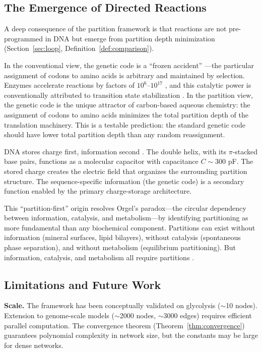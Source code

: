 \documentclass[twocolumn,10pt,a4paper]{article}
\theoremstyle{definition}
\theoremstyle{remark}
\begin{document}
\subsection{The Emergence of Directed Reactions}

A deep consequence of the partition framework is that reactions are not pre-programmed in DNA but emerge from partition depth minimization (Section~\ref{sec:loop}, Definition~\ref{def:comparison}).

In the conventional view, the genetic code is a ``frozen accident'' \citep{Eigen1971}---the particular assignment of codons to amino acids is arbitrary and maintained by selection. Enzymes accelerate reactions by factors of $10^6$--$10^{17}$ \citep{Wolfenden2001}, and this catalytic power is conventionally attributed to transition state stabilization \citep{Eyring1935}. In the partition view, the genetic code is the unique attractor of carbon-based aqueous chemistry: the assignment of codons to amino acids minimizes the total partition depth of the translation machinery. This is a testable prediction: the standard genetic code should have lower total partition depth than any random reassignment.

DNA stores charge first, information second \citep{Sachikonye2024c}. The double helix, with its $\pi$-stacked base pairs, functions as a molecular capacitor with capacitance $C \sim 300$ pF. The stored charge creates the electric field that organizes the surrounding partition structure. The sequence-specific information (the genetic code) is a secondary function enabled by the primary charge-storage architecture.

This ``partition-first'' origin resolves Orgel's paradox---the circular dependency between information, catalysis, and metabolism---by identifying partitioning as more fundamental than any biochemical component. Partitions can exist without information (mineral surfaces, lipid bilayers), without catalysis (spontaneous phase separation), and without metabolism (equilibrium partitioning). But information, catalysis, and metabolism all require partitions \citep{Sachikonye2024c}.

\subsection{Limitations and Future Work}

\textbf{Scale.} The framework has been conceptually validated on glycolysis ($\sim$10 nodes). Extension to genome-scale models ($\sim$2000 nodes, $\sim$3000 edges) requires efficient parallel computation. The convergence theorem (Theorem~\ref{thm:convergence}) guarantees polynomial complexity in network size, but the constants may be large for dense networks.
\end{document}
